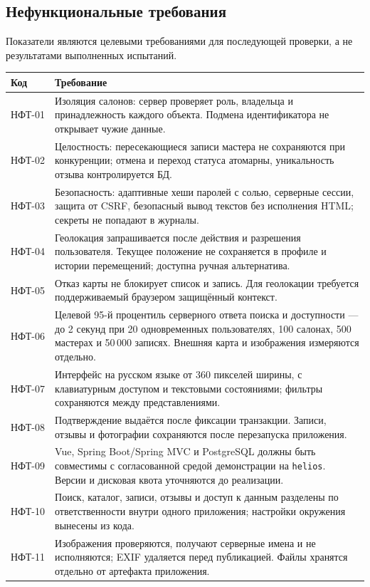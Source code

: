 \subsection{Нефункциональные требования}
Показатели являются целевыми требованиями для последующей проверки, а не результатами выполненных испытаний.
\begin{longtable}{L{1.6cm}L{13.2cm}}
\toprule Код & Требование \\ \midrule
\endhead
НФТ-01 & Изоляция салонов: сервер проверяет роль, владельца и принадлежность каждого объекта. Подмена идентификатора не открывает чужие данные. \\
НФТ-02 & Целостность: пересекающиеся записи мастера не сохраняются при конкуренции; отмена и переход статуса атомарны, уникальность отзыва контролируется БД. \\
НФТ-03 & Безопасность: адаптивные хеши паролей с солью, серверные сессии, защита от CSRF, безопасный вывод текстов без исполнения HTML; секреты не попадают в журналы. \\
НФТ-04 & Геолокация запрашивается после действия и разрешения пользователя. Текущее положение не сохраняется в профиле и истории перемещений; доступна ручная альтернатива. \\
НФТ-05 & Отказ карты не блокирует список и запись. Для геолокации требуется поддерживаемый браузером защищённый контекст. \\
НФТ-06 & Целевой 95-й процентиль серверного ответа поиска и доступности --- до 2 секунд при 20 одновременных пользователях, 100 салонах, 500 мастерах и 50\,000 записях. Внешняя карта и изображения измеряются отдельно. \\
НФТ-07 & Интерфейс на русском языке от 360 пикселей ширины, с клавиатурным доступом и текстовыми состояниями; фильтры сохраняются между представлениями. \\
НФТ-08 & Подтверждение выдаётся после фиксации транзакции. Записи, отзывы и фотографии сохраняются после перезапуска приложения. \\
НФТ-09 & Vue, Spring Boot/Spring MVC и PostgreSQL должны быть совместимы с согласованной средой демонстрации на \texttt{helios}. Версии и дисковая квота уточняются до реализации. \\
НФТ-10 & Поиск, каталог, записи, отзывы и доступ к данным разделены по ответственности внутри одного приложения; настройки окружения вынесены из кода. \\
НФТ-11 & Изображения проверяются, получают серверные имена и не исполняются; EXIF удаляется перед публикацией. Файлы хранятся отдельно от артефакта приложения. \\
\bottomrule
\end{longtable}

